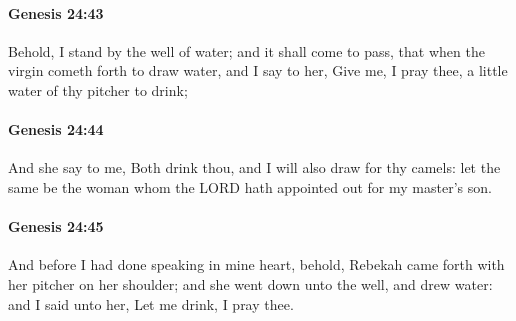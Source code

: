 		\paragraph{Genesis 24:43} %
			\label{GENESIS-24-43}

			Behold, I stand by the well of water; and it shall come to pass, that when the virgin cometh forth to draw water, and I say to her, Give me, I pray thee, a little water of thy pitcher to drink;


		\paragraph{Genesis 24:44} %
			\label{GENESIS-24-44}

			And she say to me, Both drink thou, and I will also draw for thy camels: let the same be the woman whom the LORD hath appointed out for my master's son.


		\paragraph{Genesis 24:45} %
			\label{GENESIS-24-45}

			And before I had done speaking in mine heart, behold, Rebekah came forth with her pitcher on her shoulder; and she went down unto the well, and drew water: and I said unto her, Let me drink, I pray thee.


